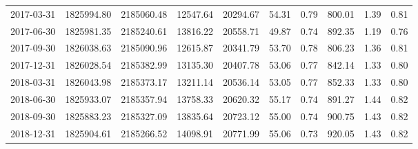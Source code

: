 \begin{landscape}
\begin{longtable}{llllllllll}
2017-03-31 & 1825994.80 & 2185060.48 & 12547.64 & 20294.67 & 54.31 & 0.79 & 800.01 & 1.39 & 0.81 \\
2017-06-30 & 1825981.35 & 2185240.61 & 13816.22 & 20558.71 & 49.87 & 0.74 & 892.35 & 1.19 & 0.76 \\
2017-09-30 & 1826038.63 & 2185090.96 & 12615.87 & 20341.79 & 53.70 & 0.78 & 806.23 & 1.36 & 0.81 \\
2017-12-31 & 1826028.54 & 2185382.99 & 13135.30 & 20407.78 & 53.06 & 0.77 & 842.14 & 1.33 & 0.80 \\
2018-03-31 & 1826043.98 & 2185373.17 & 13211.14 & 20536.14 & 53.05 & 0.77 & 852.33 & 1.33 & 0.80 \\
2018-06-30 & 1825933.07 & 2185357.94 & 13758.33 & 20620.32 & 55.17 & 0.74 & 891.27 & 1.44 & 0.82 \\
2018-09-30 & 1825883.23 & 2185327.09 & 13835.64 & 20723.12 & 55.00 & 0.74 & 900.75 & 1.43 & 0.82 \\
2018-12-31 & 1825904.61 & 2185266.52 & 14098.91 & 20771.99 & 55.06 & 0.73 & 920.05 & 1.43 & 0.82

\end{longtable}
\end{landscape}


